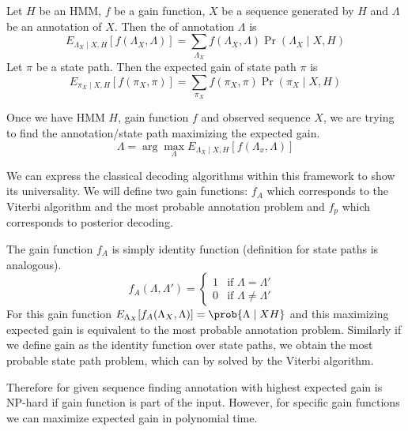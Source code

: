 \begin{definition}
Let $H$ be an HMM, $f$ be a gain function, $X$ be a sequence generated by $H$ and
$\Lambda$ be an annotation of $X$. Then the  of annotation
$\Lambda$ is 
\begin{equation}
E_{\Lambda_X\mid X,H}[f(\Lambda_X,\Lambda)] =
\sum_{\Lambda_X}f(\Lambda_X,\Lambda)\Pr\left(\Lambda_X\mid X,H\right)
\end{equation}
Let $\pi$ be a state path. Then the expected gain of state path $\pi$ is 
\begin{equation}
E_{\pi_X\mid X,H}[f(\pi_X,\pi)] =
\sum_{\pi_X}f(\pi_X,\pi)\Pr\left(\pi_X\mid X,H\right)
\end{equation}

\end{definition}


Once we have HMM $H$, gain function $f$ and observed sequence $X$,
we are trying to find the annotation/state path maximizing the expected gain. 
\begin{equation}
\Lambda = \arg\max_{\Lambda}E_{\Lambda_X\mid
X,H}\left[f\left(\Lambda_x,\Lambda\right)\right]
\end{equation}

We can express the classical decoding algorithms within this framework to show
its universality. We will define two gain functions: $f_A$ which corresponds to
the  
Viterbi algorithm and the most probable annotation problem and $f_p$ which
corresponds to 
posterior decoding.

The gain function $f_A$ is simply identity function (definition for state paths
is analogous).
\begin{equation}
f_A(\Lambda,\Lambda') = \begin{cases}
1 & \text{if $\Lambda = \Lambda'$ }\\
0 & \text{if $\Lambda \not=\Lambda'$}
\end{cases}
\end{equation}
For this gain function $E_{\Lambda_X}[f_A(\Lambda_X,\Lambda)]=\prob{\Lambda\mid
X H}$ and this
maximizing expected gain is 
equivalent to the most probable annotation problem. Similarly if we define gain
as the identity function over state paths, we obtain the most probable state
path problem, which can by solved by the Viterbi algorithm.

Therefore for given sequence finding annotation with highest expected gain is
NP-hard if gain function is part of the input. However, for specific gain
functions we can maximize expected gain in polynomial time.


